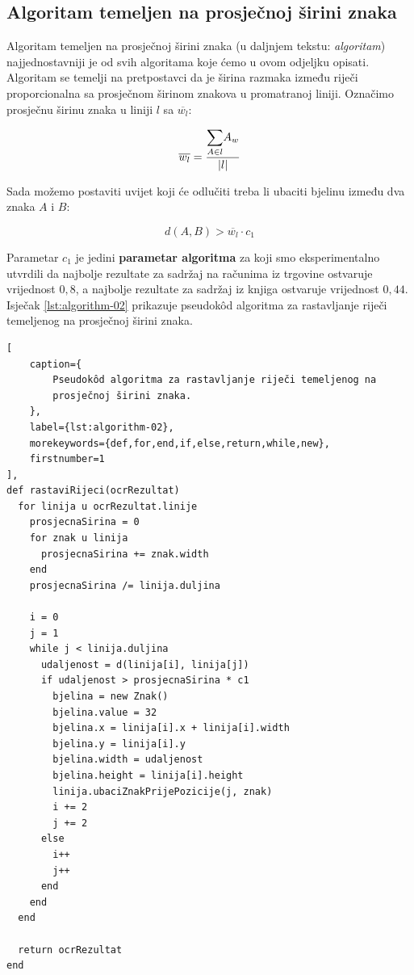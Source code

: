 \documentclass[times, utf8, zavrsni]{fer}
\begin{document}
\subsection{Algoritam temeljen na prosječnoj širini znaka}
\label{subsec:algoritam-temeljen-na-prosjecnoj-sirini znaka}
Algoritam temeljen na prosječnoj širini znaka (u daljnjem tekstu: \emph
{algoritam}) najjednostavniji je od svih algoritama koje ćemo u ovom odjeljku
opisati. Algoritam se temelji na pretpostavci da je širina razmaka između
riječi proporcionalna sa prosječnom širinom znakova u promatranoj liniji.
Označimo prosječnu širinu znaka u liniji $l$ sa $\overline{w_l}$:

\begin{equation}
\overline{w_l} = \frac{\mathlarger{\sum}\limits_{A \in l} A_w}{|l|}
\end{equation}

Sada možemo postaviti uvijet koji će odlučiti treba li ubaciti bjelinu između
dva znaka $A$ i $B$:

\begin{equation}
\label{eq:condition-01}
d(A, B) > \overline{w_l} \cdot c_1
\end{equation}

Parametar $c_1$ je jedini \textbf{parametar algoritma} za koji smo
eksperimentalno utvrdili da najbolje rezultate za sadržaj na računima iz
trgovine ostvaruje vrijednost $0{,}8$, a najbolje rezultate za sadržaj iz knjiga
ostvaruje vrijednost $0{,}44$. Isječak \ref{lst:algorithm-02} prikazuje
pseudokôd algoritma za rastavljanje riječi temeljenog na prosječnoj širini
znaka.

\begin{lstlisting}[
    caption={
        Pseudokôd algoritma za rastavljanje riječi temeljenog na
        prosječnoj širini znaka.
    },
    label={lst:algorithm-02},
    morekeywords={def,for,end,if,else,return,while,new},
    firstnumber=1
],
def rastaviRijeci(ocrRezultat)
  for linija u ocrRezultat.linije
    prosjecnaSirina = 0
    for znak u linija
      prosjecnaSirina += znak.width
    end
    prosjecnaSirina /= linija.duljina

    i = 0
    j = 1
    while j < linija.duljina
      udaljenost = d(linija[i], linija[j])
      if udaljenost > prosjecnaSirina * c1
        bjelina = new Znak()
        bjelina.value = 32
        bjelina.x = linija[i].x + linija[i].width
        bjelina.y = linija[i].y
        bjelina.width = udaljenost
        bjelina.height = linija[i].height
        linija.ubaciZnakPrijePozicije(j, znak)
        i += 2
        j += 2
      else
        i++
        j++
      end
    end
  end

  return ocrRezultat
end
\end{lstlisting}
\end{document}
